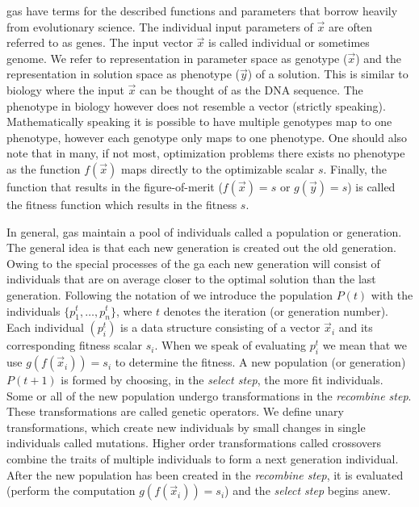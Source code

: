 \glspl{ga} have terms for the described functions and parameters that borrow heavily from evolutionary science. The individual input parameters of $\vec{x}$ are often referred to as \glspl{gene}. The input vector $\vec{x}$ is called \gls{individual} or sometimes \gls{genome}. We refer to representation in parameter space as \gls{genotype} ($\vec{x}$) and the representation in solution space as  \gls{phenotype} ($\vec{y}$) of a solution. This is similar to biology where the input $\vec{x}$ can be thought of as the DNA sequence. The \gls{phenotype} in biology however does not resemble a vector (strictly speaking).  Mathematically speaking it is possible to have multiple \glspl{genotype} map to one \gls{phenotype}, however each \gls{genotype} only maps to one phenotype. 
One should also note that in many, if not most, optimization problems there exists no \gls{phenotype} as the function $f(\vec{x})$ maps directly to the optimizable scalar $s$. Finally, the function that results in the figure-of-merit ($f(\vec{x})=s$ or $g(\vec{y})=s$) is called the \gls{fitness} function which results in the \gls{fitness} $s$. 

In general, \glspl{ga} maintain a pool of \glspl{individual} called a population or generation. The general idea is that each new generation is created out the old generation. Owing to the special processes of the \gls{ga} each new generation will consist of \glspl{individual} that are on average closer to the optimal solution than the last generation. Following the notation of \citet{Michalewicz:1994:GAD:184675} we introduce the population $P(t)$ with the \glspl{individual}  $\{p_{1}^{t}, \dots, p_{n}^{t}\}$, where $t$ denotes the iteration (or generation number). Each individual $(p_{i}^t)$ is a data structure consisting of a vector $\vec{x}_i$ and its corresponding fitness scalar $s_i$.  When we speak of evaluating $p_{i}^{t}$ we mean that we use $g(f(\vec{x}_i))=s_i$ to determine the fitness. A new population (or generation) $P(t+1)$ is formed by choosing, in the \textit{select step}, the more fit individuals. Some or all of the new population undergo transformations in the \textit{recombine step}. These transformations are called genetic operators. We define unary transformations, which create new individuals by small changes in single individuals called \glspl{mutation}. Higher order transformations called \glspl{crossover} combine the traits of multiple individuals to form a next generation individual. 
After the new population has been created in the \textit{recombine step}, it is evaluated (perform the computation $g(f(\vec{x}_i))=s_i$) and the \textit{select step} begins anew. 

